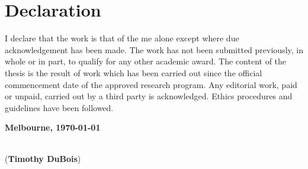 \chapter{Declaration}


I declare that the work is that of the me alone except where due acknowledgement has been made. The work has not been submitted previously, in whole or in part, to qualify for any other academic award. The content of the thesis is the result of work which has been carried out since the official commencement date of the approved research program. Any editorial work, paid or unpaid, carried out by a third party is acknowledged. Ethics procedures and guidelines have been followed.


\textbf{Melbourne, \today}
\vspace{1.5cm}

\dotfill\hspace*{6.5cm}\\
\hspace*{2cm}(\textbf{Timothy DuBois}) %